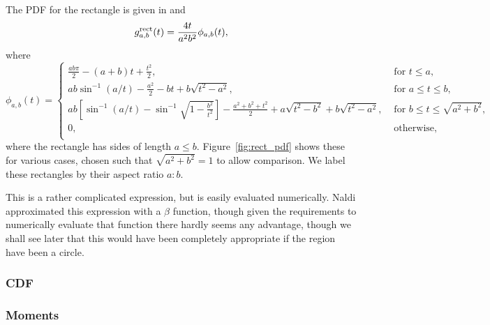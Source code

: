 The PDF for the rectangle is given in \cite[Theorem
2.4.4]{mathai_geom} and \cite[Theorem 2]{b.ghosh51:_random_rect}
\begin{equation}
  g^{\rm rect}_{a,b}(t) = \frac{4 t}{a^2 b^2} \phi_{a,b}(t),
  \label{eqn:rectangle}   
\end{equation}
where
\begin{equation}
  \phi_{a,b}(t) = \left\{
    \begin{array}{ll}
      \frac{ab \pi}{2} - (a+b) t + \frac{t^2}{2}, 
         & \mbox{ for } t \leq a, \\
      a b \sin^{-1} (a/t) - \frac{a^2}{2} - b t + b\sqrt{t^2 - a^2},
         & \mbox{ for } a \leq t \leq b, \\
      a b \left[ \sin^{-1} (a/t) - \sin^{-1} \sqrt{1 - \frac{b^2}{t^2}} \right]
        - \frac{a^2 + b^2 + t^2}{2} 
        + a\sqrt{t^2 - b^2}+ b\sqrt{t^2 - a^2},
         & \mbox{ for } b \leq t \leq \sqrt{a^2 + b^2}, \\
      0,
         & \mbox{ otherwise}, \\
    \end{array} \right. 
\end{equation}
where the rectangle has sides of length $a \leq
b$. Figure~\ref{fig:rect_pdf} shows these for various cases, chosen
such that $\sqrt{a^2 + b^2} = 1$ to allow comparison. We label these
rectangles by their aspect ratio $a: b$.

This is a rather complicated expression, but is easily evaluated
numerically.  Naldi \cite{m.naldi05:_connec_of_waxman_graph}
approximated this expression with a $\beta$ function, though given the
requirements to numerically evaluate that function there hardly seems
any advantage, though we shall see later that this would have been
completely appropriate if the region have been a circle.

\subsubsection{CDF}


\subsubsection{Moments}

